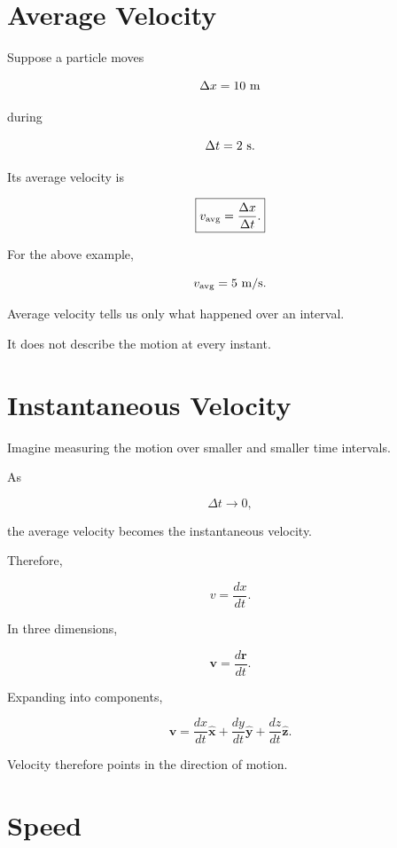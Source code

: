 \documentclass[11pt,a4paper,openany]{book}
\newcounter{example}[chapter]
\begin{document}

\section{Average Velocity}

Suppose a particle moves

\[
\Delta x
=
10\ {\rm m}
\]

during

\[
\Delta t
=
2\ {\rm s}.
\]

Its average velocity is

\[
\boxed{
	v_{\rm avg}
	=
	\frac{\Delta x}{\Delta t}.
}
\]

For the above example,

\[
v_{\rm avg}
=
5\ {\rm m/s}.
\]

Average velocity tells us only what happened over an interval.

It does not describe the motion at every instant.


\section{Instantaneous Velocity}

Imagine measuring the motion over smaller and smaller time intervals.

As

\[
\Delta t\rightarrow0,
\]

the average velocity becomes the instantaneous velocity.

Therefore,

\[
\boxed{
	v
	=
	\frac{dx}{dt}.
}
\]

In three dimensions,

\[
\boxed{
	\mathbf v
	=
	\frac{d\mathbf r}{dt}.
}
\]

Expanding into components,

\[
\boxed{
	\mathbf v
	=
	\frac{dx}{dt}\hat{\mathbf x}
	+
	\frac{dy}{dt}\hat{\mathbf y}
	+
	\frac{dz}{dt}\hat{\mathbf z}.
}
\]

Velocity therefore points in the direction of motion.


\section{Speed}
\end{document}
